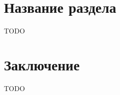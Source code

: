 \documentclass[12pt,twoside]{article}
\begin{document}
\section{Название раздела}

{\Huge TODO}

%
%
%
%
%
%

\section{Заключение}

{\Huge TODO}





%

\end{document}
